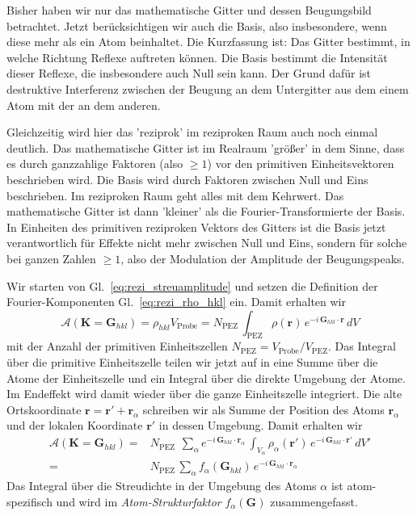 Bisher haben wir nur das mathematische Gitter und dessen Beugungsbild betrachtet. Jetzt berücksichtigen wir auch die Basis, also insbesondere, wenn diese mehr als ein Atom beinhaltet. Die Kurzfassung ist: Das Gitter bestimmt, in welche Richtung Reflexe auftreten können. Die Basis bestimmt die Intensität dieser Reflexe, die insbesondere auch Null sein kann. Der Grund dafür ist destruktive Interferenz zwischen der Beugung an dem Untergitter aus dem einem Atom mit der an dem anderen.

Gleichzeitig wird hier das 'reziprok' im reziproken Raum auch noch einmal deutlich. Das mathematische Gitter ist im Realraum 'größer' in dem Sinne, dass es durch ganzzahlige Faktoren (also $\ge 1$) vor den primitiven Einheitsvektoren beschrieben wird. Die Basis wird durch Faktoren zwischen Null und Eins beschrieben. Im reziproken Raum geht alles mit dem Kehrwert. Das mathematische Gitter ist dann 'kleiner' als die Fourier-Transformierte der Basis. In Einheiten des primitiven reziproken Vektors des Gitters ist die Basis jetzt verantwortlich für Effekte nicht mehr zwischen Null und Eins, sondern für solche bei ganzen Zahlen $\ge 1$, also der Modulation der Amplitude der Beugungspeaks.

Wir starten von Gl.~\ref{eq:rezi_streuamplitude} und setzen die Definition der Fourier-Komponenten Gl.~\ref{eq:rezi_rho_hkl} ein. Damit erhalten wir
\begin{equation}
\mathcal{A}(\mathbf{K} = \mathbf{G}_{hkl} ) 
=  \rho_{hkl} V_\text{Probe}
=  N_\text{PEZ} \, \int_\text{PEZ}    \rho(\mathbf{r})\,  e^{-i \, \mathbf{G}_{hkl} \cdot \mathbf{r}} \, dV 
\end{equation}
mit der Anzahl der primitiven Einheitszellen $ N_\text{PEZ} =  V_\text{Probe} / V_\text{PEZ}$.
Das Integral über die primitive Einheitszelle teilen wir jetzt auf in eine Summe über die Atome der Einheitszelle und ein Integral über die direkte Umgebung der Atome. Im Endeffekt wird damit wieder über die ganze Einheitszelle integriert. Die alte Ortskoordinate  $\mathbf{r} =  \mathbf{r}' +  \mathbf{r}_\alpha$ schreiben wir als Summe der Position des Atoms  $\mathbf{r}_\alpha$ und der lokalen Koordinate $\mathbf{r}'$ in dessen Umgebung. Damit erhalten wir
\begin{align}
\mathcal{A}(\mathbf{K} = \mathbf{G}_{hkl} ) 
=   &  N_\text{PEZ}  \, \
\sum_\alpha e^{-i \, \mathbf{G}_{hkl} \cdot \mathbf{r}_\alpha} \, \int_{V_\alpha}  
 \rho_\alpha(\mathbf{r'})\,  e^{-i \, \mathbf{G}_{hkl} \cdot \mathbf{r'}} \, dV' \\
 = &
 N_\text{PEZ} \, 
\sum_\alpha f_\alpha ( \mathbf{G}_{hkl} ) \, e^{-i \, \mathbf{G}_{hkl} \cdot \mathbf{r}_\alpha} 
\end{align}
Das Integral über die Streudichte in der Umgebung des Atoms $\alpha$ ist atom-spezifisch und wird im \emph{Atom-Strukturfaktor} $f_\alpha ( \mathbf{G} )$ zusammengefasst.


